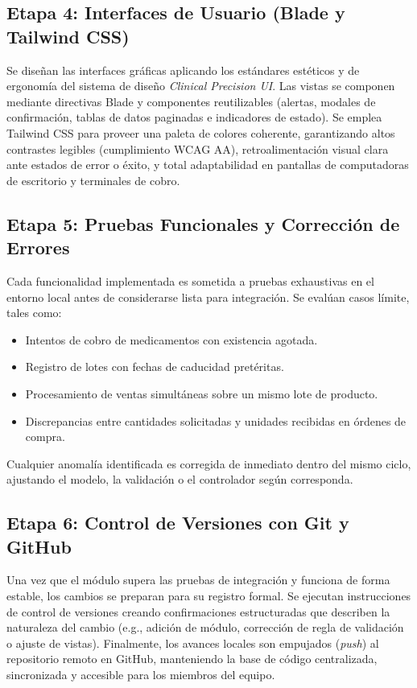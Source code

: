 \subsection{Etapa 4: Interfaces de Usuario (Blade y Tailwind CSS)}
Se diseñan las interfaces gráficas aplicando los estándares estéticos y de ergonomía del sistema de diseño \textit{Clinical Precision UI}. Las vistas se componen mediante directivas Blade y componentes reutilizables (alertas, modales de confirmación, tablas de datos paginadas e indicadores de estado). Se emplea Tailwind CSS para proveer una paleta de colores coherente, garantizando altos contrastes legibles (cumplimiento WCAG AA), retroalimentación visual clara ante estados de error o éxito, y total adaptabilidad en pantallas de computadoras de escritorio y terminales de cobro.

\subsection{Etapa 5: Pruebas Funcionales y Corrección de Errores}
Cada funcionalidad implementada es sometida a pruebas exhaustivas en el entorno local antes de considerarse lista para integración. Se evalúan casos límite, tales como:
\begin{itemize}
    \item Intentos de cobro de medicamentos con existencia agotada.
    \item Registro de lotes con fechas de caducidad pretéritas.
    \item Procesamiento de ventas simultáneas sobre un mismo lote de producto.
    \item Discrepancias entre cantidades solicitadas y unidades recibidas en órdenes de compra.
\end{itemize}
Cualquier anomalía identificada es corregida de inmediato dentro del mismo ciclo, ajustando el modelo, la validación o el controlador según corresponda.

\subsection{Etapa 6: Control de Versiones con Git y GitHub}
Una vez que el módulo supera las pruebas de integración y funciona de forma estable, los cambios se preparan para su registro formal. Se ejecutan instrucciones de control de versiones creando confirmaciones estructuradas que describen la naturaleza del cambio (e.g., adición de módulo, corrección de regla de validación o ajuste de vistas). Finalmente, los avances locales son empujados (\textit{push}) al repositorio remoto en GitHub, manteniendo la base de código centralizada, sincronizada y accesible para los miembros del equipo.

